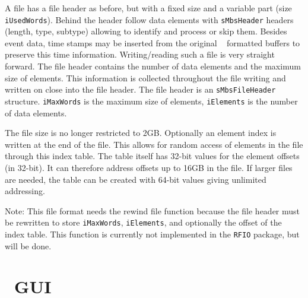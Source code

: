 A file has a file header as before, but with a fixed size and a variable part (size {\tt iUsedWords}).
Behind the header follow data elements with {\tt sMbsHeader} headers (length, type, subtype) allowing to identify and process or skip them. Besides event data, time stamps may be inserted from the original \mbs~ formatted buffers to preserve this time information. Writing/reading such a file is very straight forward. The file header contains the number of data elements and the maximum size of elements. This information is collected throughout the file writing and written on close into the file header. The file header is an {\tt sMbsFileHeader} structure.
{\tt iMaxWords} is the maximum size of elements,
{\tt iElements} is the number of data elements.

The file size is no longer restricted to 2GB. Optionally an element index is written at the end of the file. This allows for random access of elements in the file through this index table. The table itself has 32-bit values for the element offsets (in 32-bit). It can therefore address offsets up to 16GB in the file. If larger files are needed, the table can be created with 64-bit values giving unlimited addressing.

Note: This file format needs the rewind file function because the file header must be rewritten to store {\tt iMaxWords}, {\tt iElements}, and optionally the offset of the index table. This function is currently not implemented in the {\tt RFIO} package, but will be done.
\section{\mbs\ GUI}
